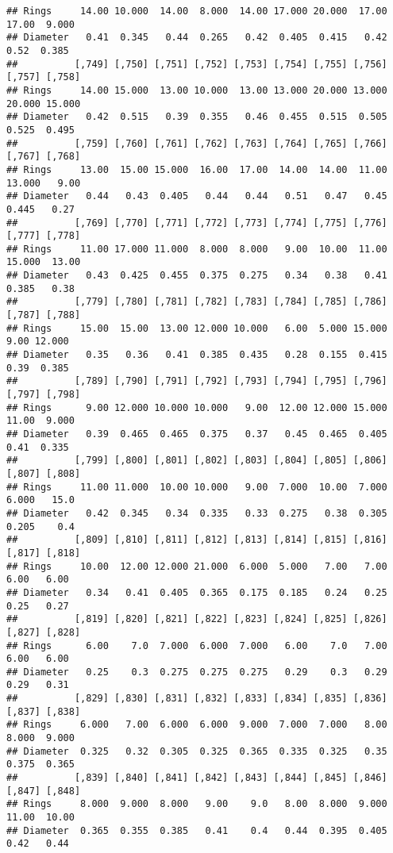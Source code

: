 \documentclass[
]{article}
\begin{document}
\begin{verbatim}
## Rings     14.00 10.000  14.00  8.000  14.00 17.000 20.000  17.00  17.00  9.000
## Diameter   0.41  0.345   0.44  0.265   0.42  0.405  0.415   0.42   0.52  0.385
##          [,749] [,750] [,751] [,752] [,753] [,754] [,755] [,756] [,757] [,758]
## Rings     14.00 15.000  13.00 10.000  13.00 13.000 20.000 13.000 20.000 15.000
## Diameter   0.42  0.515   0.39  0.355   0.46  0.455  0.515  0.505  0.525  0.495
##          [,759] [,760] [,761] [,762] [,763] [,764] [,765] [,766] [,767] [,768]
## Rings     13.00  15.00 15.000  16.00  17.00  14.00  14.00  11.00 13.000   9.00
## Diameter   0.44   0.43  0.405   0.44   0.44   0.51   0.47   0.45  0.445   0.27
##          [,769] [,770] [,771] [,772] [,773] [,774] [,775] [,776] [,777] [,778]
## Rings     11.00 17.000 11.000  8.000  8.000   9.00  10.00  11.00 15.000  13.00
## Diameter   0.43  0.425  0.455  0.375  0.275   0.34   0.38   0.41  0.385   0.38
##          [,779] [,780] [,781] [,782] [,783] [,784] [,785] [,786] [,787] [,788]
## Rings     15.00  15.00  13.00 12.000 10.000   6.00  5.000 15.000   9.00 12.000
## Diameter   0.35   0.36   0.41  0.385  0.435   0.28  0.155  0.415   0.39  0.385
##          [,789] [,790] [,791] [,792] [,793] [,794] [,795] [,796] [,797] [,798]
## Rings      9.00 12.000 10.000 10.000   9.00  12.00 12.000 15.000  11.00  9.000
## Diameter   0.39  0.465  0.465  0.375   0.37   0.45  0.465  0.405   0.41  0.335
##          [,799] [,800] [,801] [,802] [,803] [,804] [,805] [,806] [,807] [,808]
## Rings     11.00 11.000  10.00 10.000   9.00  7.000  10.00  7.000  6.000   15.0
## Diameter   0.42  0.345   0.34  0.335   0.33  0.275   0.38  0.305  0.205    0.4
##          [,809] [,810] [,811] [,812] [,813] [,814] [,815] [,816] [,817] [,818]
## Rings     10.00  12.00 12.000 21.000  6.000  5.000   7.00   7.00   6.00   6.00
## Diameter   0.34   0.41  0.405  0.365  0.175  0.185   0.24   0.25   0.25   0.27
##          [,819] [,820] [,821] [,822] [,823] [,824] [,825] [,826] [,827] [,828]
## Rings      6.00    7.0  7.000  6.000  7.000   6.00    7.0   7.00   6.00   6.00
## Diameter   0.25    0.3  0.275  0.275  0.275   0.29    0.3   0.29   0.29   0.31
##          [,829] [,830] [,831] [,832] [,833] [,834] [,835] [,836] [,837] [,838]
## Rings     6.000   7.00  6.000  6.000  9.000  7.000  7.000   8.00  8.000  9.000
## Diameter  0.325   0.32  0.305  0.325  0.365  0.335  0.325   0.35  0.375  0.365
##          [,839] [,840] [,841] [,842] [,843] [,844] [,845] [,846] [,847] [,848]
## Rings     8.000  9.000  8.000   9.00    9.0   8.00  8.000  9.000  11.00  10.00
## Diameter  0.365  0.355  0.385   0.41    0.4   0.44  0.395  0.405   0.42   0.44

\end{verbatim}
\end{document}
